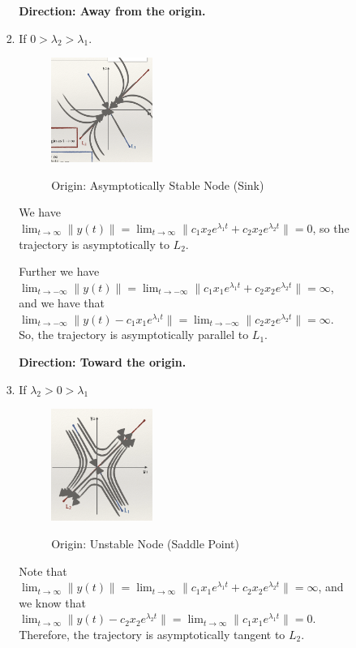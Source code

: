 \documentclass[12pt, a4paper]{article}
\def\dsst{\displaystyle}
\begin{document}
\begin{itemize}
\begin{enumerate}
\begin{enumerate}
\begin{enumerate}
					\textbf{Direction: Away from the origin. }
					\item If $0>\lambda_2>\lambda_1$. 
					\begin{figure}[H]
						\centering
						\includegraphics[width=0.38\textwidth]{fig/fig8}\label{fig8}
						\caption{Origin: Asymptotically Stable Node (Sink)}
					\end{figure}
					We have $\dsst\lim_{t\to\infty}\|y(t)\|=\lim_{t\to\infty}\|c_1x_2e^{\lambda_1t}+c_2x_2e^{\lambda_2t}\|=0$, so the trajectory is asymptotically to $L_2$.\par 
					Further we have $\dsst\lim_{t\to-\infty}\|y(t)\|=\lim_{t\to-\infty}\|c_1x_1e^{\lambda_1t}+c_2x_2e^{\lambda_2t}\|=\infty$, and we have that $\dsst\lim_{t\to-\infty}\|y(t)-c_1x_1e^{\lambda_1t}\|=\lim_{t\to-\infty}\|c_2x_2e^{\lambda_2t}\|=\infty$. So, the trajectory is asymptotically parallel to $L_1$.\par 
					\textbf{Direction: Toward the origin.}
					\item If $\lambda_2>0>\lambda_1$
					\begin{figure}[H]
						\centering
						\includegraphics[width=0.38\textwidth]{fig/fig9}\label{fig9}
						\caption{Origin: Unstable Node (Saddle Point)}
					\end{figure}
					Note that $\dsst\lim_{t\to\infty}\|y(t)\|=\lim_{t\to\infty}\|c_1x_1e^{\lambda_1t}+c_2x_2e^{\lambda_2t}\|=\infty$, and we know that $\dsst\lim_{t\to\infty}\|y(t)-c_2x_2e^{\lambda_2t}\|=\lim_{t\to\infty}\|c_1x_1e^{\lambda_1t}\|=0$. Therefore, the trajectory is asymptotically tangent to $L_2$. \par 

\end{enumerate}
\end{enumerate}
\end{enumerate}
\end{itemize}
\end{document}
